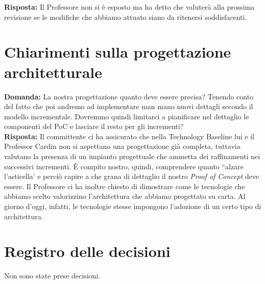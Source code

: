 \documentclass{article}
\begin{document}
\textbf{Risposta:} Il Professore non si è esposto ma ha detto che valuterà alla prossima revisione se le modifiche che abbiamo attuato siano da ritenersi soddisfacenti.

\section{Chiarimenti sulla progettazione architetturale}%
\label{sec:chiarimenti_sulla_progettazione_architetturale}

\textbf{Domanda:} La nostra progettazione quanto deve essere precisa? Tenendo conto del fatto che poi andremo ad implementare man mano nuovi dettagli secondo il modello incrementale. Dovremmo quindi limitarci a pianificare nel dettaglio le componenti del PoC e lasciare il resto per gli incrementi?\\

\textbf{Risposta:} Il committente ci ha assicurato che nella Technology Baseline lui e il Professor Cardin non si aspettano una progettazione già completa, tuttavia valutano la presenza di un impianto progettuale che ammetta dei raffinamenti nei successivi incrementi.
È compito nostro, quindi, comprendere quanto ``alzare l'asticella' e perciò capire a che grana di dettaglio il nostro \textit{Proof of Concept} deve essere.
Il Professore ci ha inoltre chiesto di dimostrare come le tecnologie che abbiamo scelto valorizzino l'architettura che abbiamo progettato su carta.
Al giorno d'oggi, infatti, le tecnologie stesse impongono l'adozione di un certo tipo di architettura.

\newpage
\section{Registro delle decisioni}%
\label{sec:registro_delle_decisioni}

Non sono state prese decisioni.
\end{document}
